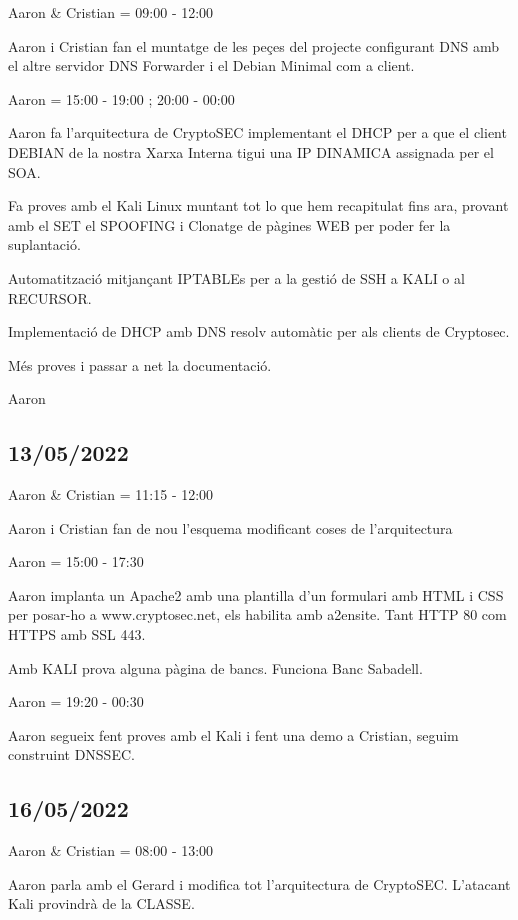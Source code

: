\documentclass[]{article}
\begin{document}
Aaron \& Cristian = 09:00 - 12:00

Aaron i Cristian fan el muntatge de les peçes del projecte configurant
DNS amb el altre servidor DNS Forwarder i el Debian Minimal com a
client.

Aaron = 15:00 - 19:00 ; 20:00 - 00:00

Aaron fa l'arquitectura de CryptoSEC implementant el DHCP per a que el
client DEBIAN de la nostra Xarxa Interna tigui una IP DINAMICA assignada
per el SOA.

Fa proves amb el Kali Linux muntant tot lo que hem recapitulat fins ara,
provant amb el SET el SPOOFING i Clonatge de pàgines WEB per poder fer
la suplantació.

Automatització mitjançant IPTABLEs per a la gestió de SSH a KALI o al
RECURSOR.

Implementació de DHCP amb DNS resolv automàtic per als clients de
Cryptosec.

Més proves i passar a net la documentació.

Aaron

\hypertarget{section-15}{%
\subsection{13/05/2022}\label{section-15}}

Aaron \& Cristian = 11:15 - 12:00

Aaron i Cristian fan de nou l'esquema modificant coses de l'arquitectura

Aaron = 15:00 - 17:30

Aaron implanta un Apache2 amb una plantilla d'un formulari amb HTML i
CSS per posar-ho a www.cryptosec.net, els habilita amb a2ensite. Tant
HTTP 80 com HTTPS amb SSL 443.

Amb KALI prova alguna pàgina de bancs. Funciona Banc Sabadell.

Aaron = 19:20 - 00:30

Aaron segueix fent proves amb el Kali i fent una demo a Cristian, seguim
construint DNSSEC.

\hypertarget{section-16}{%
\subsection{16/05/2022}\label{section-16}}

Aaron \& Cristian = 08:00 - 13:00

Aaron parla amb el Gerard i modifica tot l'arquitectura de CryptoSEC.
L'atacant Kali provindrà de la CLASSE.
\end{document}
